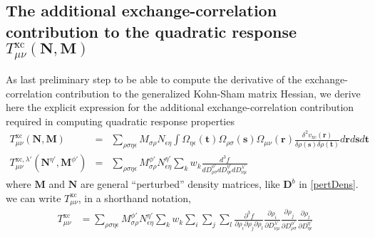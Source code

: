 \documentclass[preprint,preprintnumbers,amsmath,amssymb,11pt]{revtex4}
\def\xc{\textrm{xc}}
\begin{document}
 \subsection{The additional  exchange-correlation contribution to the quadratic response $T^{\xc}_{\mu \nu}(\textbf{N},\textbf{M})$}
 \label{TxcAppendix}
 As last preliminary step to be able to compute the derivative of the exchange-correlation contribution to the generalized Kohn-Sham matrix Hessian, 
 we derive here the explicit expression for the additional exchange-correlation contribution required in computing quadratic response properties~\cite{Thomas_QRRSP} 
\begin{eqnarray}\label{TxcdefinitionTK}
T^{\xc}_{\mu \nu}(\textbf{N},\textbf{M})&=&\sum_{\rho \sigma \eta
   \epsilon} M_{\sigma \rho} N_{\epsilon \eta} \int \Omega_{\eta \epsilon}(\textbf{t})
 \Omega_{\rho \sigma}(\textbf{s}) \Omega_{\mu \nu}(\textbf{r})
  \frac{\delta^{2}
 v_\text{xc}(\textbf{r})}{\delta \rho(\textbf{s}) \delta \rho(\textbf{t})} {d}\textbf{r}{d}\textbf{s}{d}\textbf{t}\\
T^{\xc,\lambda'}_{\mu \nu}(\textbf{N}^{\eta'},\textbf{M}^{\phi'})&=&\sum_{\rho \sigma \eta
   \epsilon} M^{\phi'}_{\sigma \rho} N^{\eta'}_{\epsilon \eta} \sum_{k} w_{k} \frac{d^{3} f}{d D^{\phi'}_{\rho \sigma } dD^{\eta'}_{\eta \epsilon}dD^{\lambda'}_{\nu \mu} } 
 \end{eqnarray}
 where $\textbf{M}$ and $\textbf{N}$ are general ``perturbed'' density matrices, like  $\textbf{D}^{b}$ in \eqref{pertDens}. 
 we can write $T^{\xc}_{\mu \nu}$, in a shorthand notation,
 \begin{align}
 T^{\xc}_{\mu \nu}&= \sum_{\rho \sigma \eta
   \epsilon} M^{\phi'}_{\sigma \rho} N^{\eta'}_{\epsilon \eta} \sum_{k} w_{k} \sum_{i}\sum_{j}\sum_{l} \frac{\partial^{3} f}{\partial \rho_{i} \partial \rho_{j} \partial \rho_{l}} \frac{\partial \rho_{i}}{\partial D^{\lambda'}_{\nu \mu}} \frac{\partial \rho_{j}}{\partial  D^{\phi'}_{\rho \sigma}} \frac{\partial \rho_{l}}{\partial D^{\eta'}_{\eta \epsilon}}
 \end{align}
\end{document}
